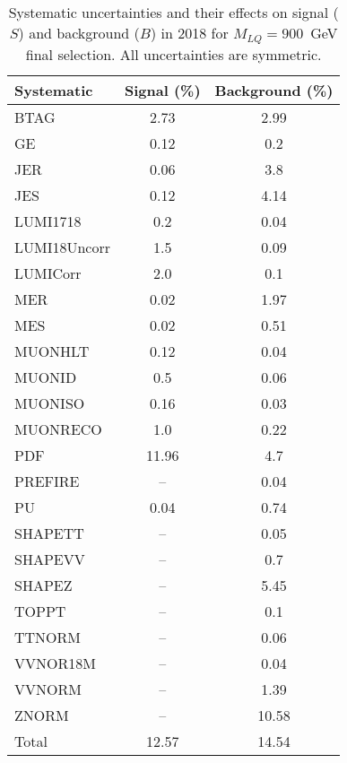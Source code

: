 \begin{table}[htbp]
\begin{center}
\caption{Systematic uncertainties and their effects on signal ($S$) and background ($B$) in 2018 for $M_{LQ}=900$~GeV final selection. All uncertainties are symmetric.}
\begin{tabular}{lcc}
\hline\hline
Systematic & Signal (\%) & Background (\%) \\ \hline 
BTAG & 2.73 & 2.99\\ 
GE & 0.12 & 0.2\\ 
JER & 0.06 & 3.8\\ 
JES & 0.12 & 4.14\\ 
LUMI1718 & 0.2 & 0.04\\ 
LUMI18Uncorr & 1.5 & 0.09\\ 
LUMICorr & 2.0 & 0.1\\ 
MER & 0.02 & 1.97\\ 
MES & 0.02 & 0.51\\ 
MUONHLT & 0.12 & 0.04\\ 
MUONID & 0.5 & 0.06\\ 
MUONISO & 0.16 & 0.03\\ 
MUONRECO & 1.0 & 0.22\\ 
PDF & 11.96 & 4.7\\ 
PREFIRE & -- & 0.04\\ 
PU & 0.04 & 0.74\\ 
SHAPETT & -- & 0.05\\ 
SHAPEVV & -- & 0.7\\ 
SHAPEZ & -- & 5.45\\ 
TOPPT & -- & 0.1\\ 
TTNORM & -- & 0.06\\ 
VVNOR18M & -- & 0.04\\ 
VVNORM & -- & 1.39\\ 
ZNORM & -- & 10.58\\ 
Total & 12.57 & 14.54\\ \hline \hline
\end{tabular}
\label{tab:SysUncertainties_uujj_900}
\end{center}
\end{table}

